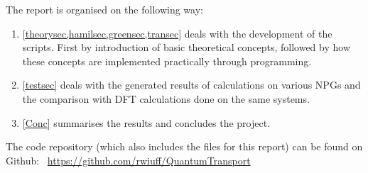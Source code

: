 The report is organised on the following way:
\begin{enumerate}
	\item \cref{theorysec,hamilsec,greensec,transec} deals with the development of the scripts. First by introduction of basic theoretical concepts, followed by how these concepts are implemented practically through programming.
	\item \cref{testsec} deals with the generated results of calculations on various NPGs and the comparison with DFT calculations done on the same systems.
	\item \cref{Conc} summarises the results and concludes the project.
\end{enumerate}
The code repository (which also includes the \latex files for this report) can be found on Github: \faGithub \ \url{https://github.com/rwiuff/QuantumTransport}
